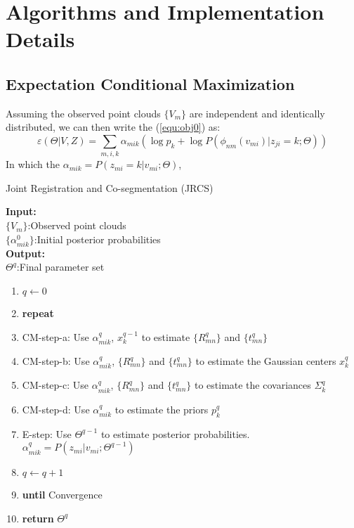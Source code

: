 \section{Algorithms and Implementation Details}
\label{sec:imp}
\subsection{Expectation Conditional Maximization}
Assuming the observed point clouds $\{V_m\}$ are independent and identically distributed, we can then write the (\ref{equ:obj0}) as: 
\begin{equation}
\label{equ:obj1}
\varepsilon(\Theta|V,Z) =\sum_{m,i,k}\alpha_{mik}(\log p_k +\log P(\phi_{nm}(v_{mi})|z_{ji}=k;\Theta))
\end{equation}
In which the $\alpha_{mik}=P(z_{mi}=k|v_{mi};\Theta)$,
\begin{algorithm}[htb]
	\caption{Joint Registration and Co-segmentation (JRCS)}
	\label{alg:jrcs}
	\textbf{Input:}~~\\
	$\{V_m\}$:Observed point clouds\\
	$\{\alpha_{mik}^0\}$:Initial posterior probabilities~~\\
	\textbf{Output:}~~\\
	$\Theta^q$:Final parameter set~~
	\begin{enumerate}
		\item $q\leftarrow0$
		\item \textbf{repeat}
		\item CM-step-a: Use $\alpha^q_{mik}$, $x^{q-1}_k$ to estimate $\{R_{mn}^q\}$ and $\{t_{mn}^q\}$
		\item CM-step-b: Use $\alpha^q_{mik}$, $\{R_{mn}^q\}$ and $\{t_{mn}^q\}$ to estimate the Gaussian centers $x_k^q$
		\item CM-step-c: Use $\alpha^q_{mik}$, $\{R_{mn}^q\}$ and $\{t_{mn}^q\}$ to estimate the covariances $\Sigma_k^q$
		\item CM-step-d: Use $\alpha^q_{mik}$ to estimate the priors $p_k^q$
		\item E-step: Use $\Theta^{q-1}$ to estimate posterior probabilities. $\alpha^q_{mik}=P(z_{mi}|v_{mi};\Theta^{q-1})$
		\item $q \leftarrow q+1$
		\item \textbf{until} Convergence
		\item \textbf{return} $\Theta^q$
	\end{enumerate}
\end{algorithm}
